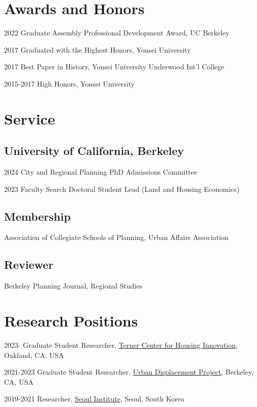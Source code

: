 \documentclass[12pt,letterpaper]{report}
\begin{document}
\section*{Awards and Honors}
    \begin{tablist}
        \item[2022] \tab{}Graduate Assembly Professional Development Award, UC Berkeley
        \item[2017] \tab{}Graduated with the Highest Honors, Yonsei University
        \item[2017] \tab{}Best Paper in History, Yonsei University Underwood Int'l College
        \item[2015-2017] \tab{}High Honors, Yonsei University
    \end{tablist}

  \section*{Service}
  \subsection*{University of California, Berkeley}
    \begin{tablist}
        \item[2024] \tab{}City and Regional Planning PhD Admissions Committee
        \item[2023] \tab{}Faculty Search Doctoral Student Lead (Land and Housing Economics)
    \end{tablist}
  \subsection*{Membership}
    Association of Collegiate Schools of Planning, Urban Affairs Association
  \subsection*{Reviewer}
    Berkeley Planning Journal, Regional Studies

    \section*{Research Positions}
    \begin{tablist}
        \item[2023-] \tab{}Graduate Student Researcher, \href{https://ternercenter.berkeley.edu/}{Terner Center for Housing Innovation}, Oakland, CA, USA
        \item[2021-2023] \tab{}Graduate Student Researcher, \href{https://www.urbandisplacement.org/}{Urban Displacement Project}, Berkeley, CA, USA
        \item[2019-2021] \tab{}Researcher, \href{si.re.kr}{Seoul Institute}, Seoul, South Korea
    \end{tablist}
\end{document}
